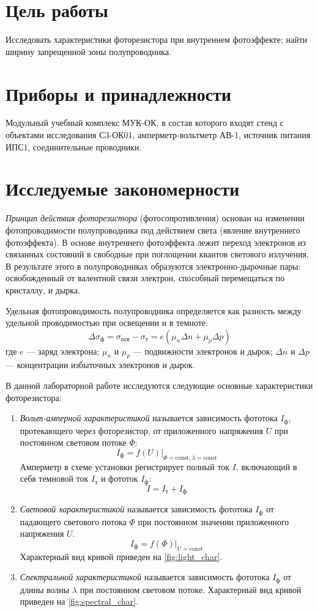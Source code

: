 \section*{Цель работы}
Исследовать характеристики фоторезистора при внутреннем фотоэффекте; найти ширину запрещенной зоны полупроводника.

\section*{Приборы и принадлежности}
Модульный учебный комплекс МУК-ОК, в состав которого входят стенд с объектами исследования С3-ОК01, амперметр-вольтметр АВ-1, источник питания ИПС1, соединительные проводники.

\section*{Исследуемые закономерности}
\textit{Принцип действия фоторезистора} (фотосопротивления) основан на изменении фотопроводимости полупроводника под действием света (явление внутреннего фотоэффекта). В основе внутреннего фотоэффекта лежит переход электронов из связанных состояний в свободные при поглощении квантов светового излучения. В результате этого в полупроводниках образуются электронно-дырочные пары: освобожденный от валентной связи электрон, способный перемещаться по кристаллу, и дырка.

Удельная фотопроводимость полупроводника определяется как разность между удельной проводимостью при освещении и в темноте:
$$ \Delta\sigma_\text{ф} = \sigma_\text{осв} - \sigma_\text{т} = e (\mu_n \Delta n + \mu_p \Delta p) $$
где $e$ — заряд электрона; $\mu_n$ и $\mu_p$ — подвижности электронов и дырок; $\Delta n$ и $\Delta p$ — концентрации избыточных электронов и дырок.

В данной лабораторной работе исследуются следующие основные характеристики фоторезистора:

\begin{enumerate}
    \item \textit{Вольт-амперной характеристикой} называется зависимость фототока $I_\text{ф}$, протекающего через фоторезистор, от приложенного напряжения $U$ при постоянном световом потоке $\Phi$:
          $$ I_\text{ф} = f(U)|_{\Phi=\text{const}, \lambda=\text{const}} $$
          Амперметр в схеме установки регистрирует полный ток $I$, включающий в себя темновой ток $I_\text{т}$ и фототок $I_\text{ф}$:
          $$ I = I_\text{т} + I_\text{ф} $$

    \item \textit{Световой характеристикой} называется зависимость фототока $I_\text{ф}$ от падающего светового потока $\Phi$ при постоянном значении приложенного напряжения $U$.
          $$ I_\text{ф} = f(\Phi)|_{U=\text{const}} $$
          Характерный вид кривой приведен на \cref{fig:light_char}.

    \item \textit{Спектральной характеристикой} называется зависимость фототока $I_\text{ф}$ от длины волны $\lambda$ при постоянном световом потоке.
          Характерный вид кривой приведен на \cref{fig:spectral_char}.
\end{enumerate}

